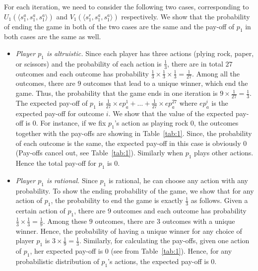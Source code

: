 For each iteration, we need to consider  the following two cases, corresponding to $U_1(\langle s_1^a,s_1^a,s_1^a \rangle ) $ and $V_1(\langle s_1^r,s_1^a,s_1^a  \rangle )$ respectively. We show that the probability of ending the game in both of the two cases are the same and the pay-off of $p_1$ in both cases are the same as well.
\begin{itemize}
	\item {\textit{Player $p_1$ is altruistic.}} 
	Since each player has three actions (plying rock, paper, or scissors) and the probability of each action is $\frac{1}{3}$, there are in total $27$ outcomes and each outcome has probability $\frac{1}{3} \times \frac{1}{3} \times \frac{1}{3} = \frac{1}{27}$. Among all the outcomes, there are $9$ outcomes that lead to a unique winner, which end the game. Thus, the probability that the game ends in one iteration 
	is $9 \times \frac{1}{27} = \frac{1}{3}$. The expected pay-off of $p_1$ is $\frac{1}{27}\times ep_a^1 +\ldots + \frac{1}{27}\times ep_a^{27}$ where $ep_a^i$
	is the expected pay-off for outcome $i$. We show that the value of the expected pay-off is $0$. For instance, if we fix $p_1$'s action as playing rock $0$, the outcomes together with the pay-offs are showing in Table~\ref{tab:1}. Since, the probability of each outcome is the same, the expected pay-off in this case is obviously $0$ (Pay-offs cancel out, see Table~\ref{tab:1}). Similarly when $p_1$ plays other actions. Hence the total pay-off for $p_1$ is $0$.  
	\item {\textit{Player $p_1$ is rational.}} Since $p_1$ is rational, he can choose any action with any probability. To show the ending probability of the game, we show that for any action of $p_1$, the probability to end the game is exactly $\frac{1}{3}$ as follows. Given a certain action of $p_1$, there are $9$ outcomes and each outcome has probability $\frac{1}{3} \times \frac{1}{3} = \frac{1}{9}$. Among these $9$ outcomes, there are $3$ outcomes with a unique winner. 
	Hence, the probability of having a unique winner for any choice of player $p_1$ is $3 \times \frac{1}{9}=\frac{1}{3}$.
	Similarly, for calculating the pay-offs, given one action of $p_1$, her expected pay-off is $0$ (see from Table~\ref{tab:1}). Hence, for any probabilistic distribution of $p_1$'s actions, the expected pay-off is $0$.

\end{itemize}
